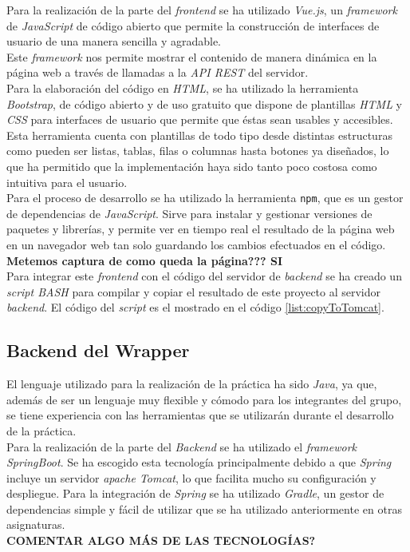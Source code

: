 \documentclass[10pt,a4paper]{article}
\begin{document}
Para la realización de la parte del \emph{frontend} se ha utilizado \emph{Vue.js}, un \emph{framework} de \emph{JavaScript} de código abierto que permite la construcción de interfaces de usuario de una manera sencilla y agradable. \\ 
Este \emph{framework} nos permite mostrar el contenido de manera dinámica en la página web a través de llamadas a la \emph{API REST} del servidor.\\
Para la elaboración del código en \emph{HTML}, se ha utilizado la herramienta \emph{Bootstrap}, de código abierto y de uso gratuito que dispone de plantillas \emph{HTML} y \emph{CSS} para interfaces de usuario que permite que éstas sean usables y accesibles. Esta herramienta cuenta con plantillas de todo tipo desde distintas estructuras como pueden ser listas, tablas, filas o columnas hasta botones ya diseñados, lo que ha permitido que la implementación haya sido tanto poco costosa como intuitiva para el usuario.\\
Para el proceso de desarrollo se ha utilizado la herramienta \texttt{npm}, que es un gestor de dependencias de \emph{JavaScript}. Sirve para instalar y gestionar versiones de paquetes y librerías, y permite ver en tiempo real el resultado de la página web en un navegador web tan solo guardando los cambios efectuados en el código.\\

\textbf{Metemos captura de como queda la página??? SI}\\

Para integrar este \emph{frontend} con el código del servidor de \emph{backend} se ha creado un \emph{script BASH} para compilar y copiar el resultado de este proyecto al servidor \emph{backend}. El código del \emph{script} es el mostrado en el código \ref{list:copyToTomcat}.



\subsection{Backend del Wrapper}
El lenguaje utilizado para la realización de la práctica ha sido \textit{Java}, ya que, además de ser un lenguaje muy flexible y cómodo para los integrantes del grupo, se tiene experiencia con las herramientas que se utilizarán durante el desarrollo de la práctica.\\
Para la realización de la parte del \textit{Backend} se ha utilizado el \textit{framework SpringBoot}. Se ha escogido esta tecnología principalmente debido a que \textit{Spring} incluye un servidor \textit{apache Tomcat}, lo que facilita mucho su configuración y despliegue. Para la integración de \textit{Spring} se ha utilizado \textit{Gradle}, un gestor de dependencias simple y fácil de utilizar que se ha utilizado anteriormente en otras asignaturas.\\
\textbf{COMENTAR ALGO MÁS DE LAS TECNOLOGÍAS?}\\
\end{document}
